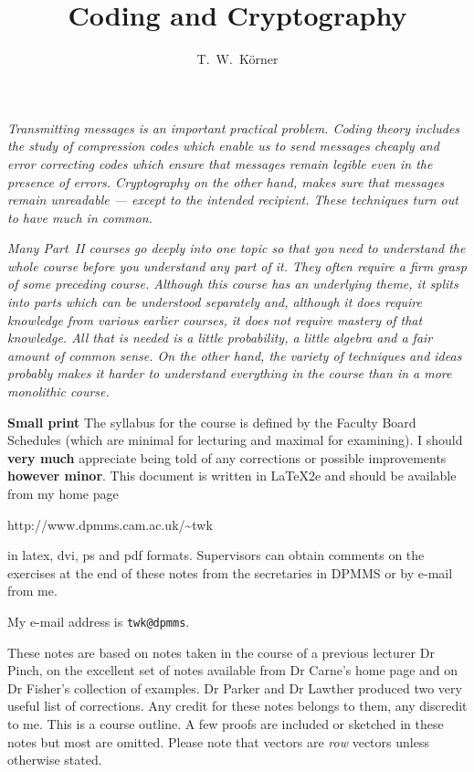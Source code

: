\documentclass[12pt,a4paper]{article}
\theoremstyle{plain}
\theoremstyle{definition}
\begin{document}
\title{Coding and Cryptography}
\author{T.~W.~K\"{o}rner}
\maketitle
\emph{Transmitting messages is an important
practical problem. Coding theory includes the
study of compression codes which enable
us to send messages cheaply and error correcting codes 
which ensure
that messages remain legible even in the
presence of errors. Cryptography on the other
hand, makes sure that messages remain unreadable --- except
to the intended recipient. These
techniques turn out to have much in common.}

\emph{Many Part~II courses go deeply into one topic so that
you need to understand the whole course before you understand
any part of it. They often require a firm grasp 
of some preceding course. Although this course has an underlying 
theme, it splits into parts which can be understood separately
and, although it does require knowledge from various earlier
courses, it does not require mastery of that knowledge.
All that is needed is a little probability, a little
algebra and a fair amount of common sense. On the other hand,
the variety of techniques and ideas probably makes
it harder to understand \emph{everything} in the course
than in a more monolithic course.}  

\vspace{1\baselineskip}

\begin{footnotesize}
\noindent
{\bf Small print}
The syllabus for the course is defined by
the Faculty Board Schedules (which are minimal for lecturing
and maximal for examining).
I should {\bf very much} appreciate being told
of any corrections or possible improvements
{\bf however minor}. 
This document
is written in \LaTeX2e and should be available from my
home page
\begin{center}
{\sf http://www.dpmms.cam.ac.uk/\textasciitilde twk}
\end{center}
in latex, dvi, ps and pdf formats.
Supervisors can obtain 
comments on the exercises at the end of these notes
from the secretaries in DPMMS or by e-mail from me.
\end{footnotesize}

\begin{footnotesize}
My e-mail address is \verb+twk@dpmms+.
\end{footnotesize}

\begin{footnotesize}
These notes are based on notes taken in the course
of a previous lecturer Dr Pinch, on the excellent
set of notes available from Dr Carne's home page
and on Dr Fisher's collection of examples. 
Dr Parker and Dr Lawther
produced two very useful list of corrections.
Any credit
for these notes belongs to them, any discredit to me.
This is a course outline. A few proofs are included
or sketched in these notes but most are omitted.
Please note that vectors are \emph{row} vectors
unless otherwise stated.
\end{footnotesize}
\newpage
\tableofcontents
\end{document}
